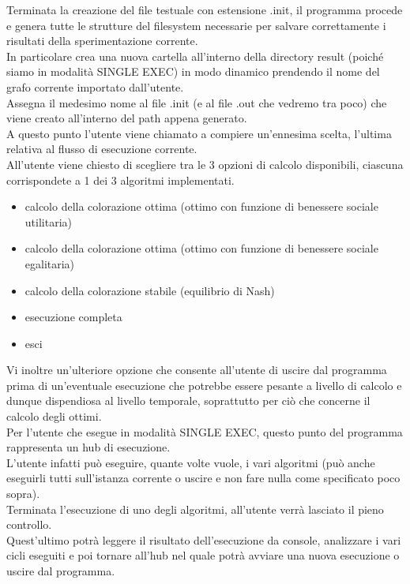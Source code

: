 Terminata la creazione del file testuale con estensione .init, il programma procede e genera tutte le strutture del filesystem necessarie per salvare correttamente i risultati della sperimentazione corrente.\\
In particolare crea una nuova cartella all'interno della directory result (poiché siamo in modalità SINGLE EXEC) in modo dinamico prendendo il nome del grafo corrente importato dall'utente.\\
Assegna il medesimo nome al file .init (e al file .out che vedremo tra poco) che viene creato all'interno del path appena generato.\\

A questo punto l'utente viene chiamato a compiere un'ennesima scelta, l'ultima relativa al flusso di esecuzione corrente.\\
All'utente viene chiesto di scegliere tra le 3 opzioni di calcolo disponibili, ciascuna corrispondete a 1 dei 3 algoritmi implementati.

\begin{itemize}
	\item calcolo della colorazione ottima (ottimo con funzione di benessere sociale utilitaria)
	\item calcolo della colorazione ottima (ottimo con funzione di benessere sociale egalitaria)
	\item calcolo della colorazione stabile (equilibrio di Nash)
	\item esecuzione completa
	\item esci
\end{itemize}

Vi inoltre un'ulteriore opzione che consente all'utente di uscire dal programma prima di un'eventuale esecuzione che potrebbe essere pesante a livello di calcolo e dunque dispendiosa al livello temporale, soprattutto per ciò che concerne il calcolo degli ottimi.\\

Per l'utente che esegue in modalità SINGLE EXEC, questo punto del programma rappresenta un hub di esecuzione.\\
L'utente infatti può eseguire, quante volte vuole, i vari algoritmi (può anche eseguirli tutti sull'istanza corrente o uscire e non fare nulla come specificato poco sopra).\\
Terminata l'esecuzione di uno degli algoritmi, all'utente verrà lasciato il pieno controllo.\\
Quest'ultimo potrà leggere il risultato dell'esecuzione da console, analizzare i vari cicli eseguiti e poi tornare all'hub nel quale potrà avviare una nuova esecuzione o uscire dal programma.\\

